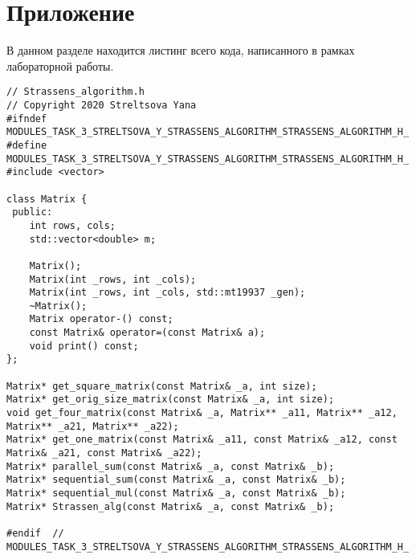 \documentclass{report}
\begin{document}
\section*{Приложение}
В данном разделе находится листинг всего кода, написанного в рамках лабораторной работы.
\begin{lstlisting}
// Strassens_algorithm.h
// Copyright 2020 Streltsova Yana
#ifndef MODULES_TASK_3_STRELTSOVA_Y_STRASSENS_ALGORITHM_STRASSENS_ALGORITHM_H_
#define MODULES_TASK_3_STRELTSOVA_Y_STRASSENS_ALGORITHM_STRASSENS_ALGORITHM_H_
#include <vector>

class Matrix {
 public:
    int rows, cols;
    std::vector<double> m;

    Matrix();
    Matrix(int _rows, int _cols);
    Matrix(int _rows, int _cols, std::mt19937 _gen);
    ~Matrix();
    Matrix operator-() const;
    const Matrix& operator=(const Matrix& a);
    void print() const;
};

Matrix* get_square_matrix(const Matrix& _a, int size);
Matrix* get_orig_size_matrix(const Matrix& _a, int size);
void get_four_matrix(const Matrix& _a, Matrix** _a11, Matrix** _a12, Matrix** _a21, Matrix** _a22);
Matrix* get_one_matrix(const Matrix& _a11, const Matrix& _a12, const Matrix& _a21, const Matrix& _a22);
Matrix* parallel_sum(const Matrix& _a, const Matrix& _b);
Matrix* sequential_sum(const Matrix& _a, const Matrix& _b);
Matrix* sequential_mul(const Matrix& _a, const Matrix& _b);
Matrix* Strassen_alg(const Matrix& _a, const Matrix& _b);

#endif  // MODULES_TASK_3_STRELTSOVA_Y_STRASSENS_ALGORITHM_STRASSENS_ALGORITHM_H_
\end{lstlisting}
\end{document}
